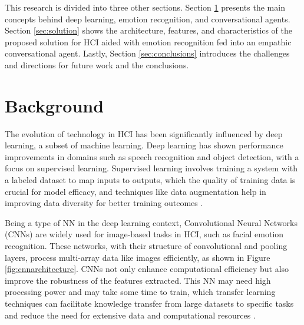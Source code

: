 \documentclass[runningheads]{llncs}
\begin{document}
This research is divided into three other sections. Section \ref{sec:background} presents the main concepts behind deep learning, emotion recognition, and conversational agents. Section \ref{sec:solution} shows the architecture, features, and characteristics of the proposed solution for HCI aided with emotion recognition fed into an empathic conversational agent. Lastly, Section \ref{sec:conclusions}  introduces the challenges and directions for future work and the conclusions. 

\section{Background}
\label{sec:background}

The evolution of technology in HCI has been significantly influenced by deep learning, a subset of machine learning. Deep learning has shown performance improvements in domains such as speech recognition and object detection, with a focus on supervised learning. Supervised learning involves training a system with a labeled dataset to map inputs to outputs, which the quality of training data is crucial for model efficacy, and techniques like data augmentation help in improving data diversity for better training outcomes \cite{Lecun2015, Alrowais2023, Benitez2021}.

Being a type of NN in the deep learning context, Convolutional Neural Networks (CNNs) are widely used for image-based tasks in HCI, such as facial emotion recognition. These networks, with their structure of convolutional and pooling layers, process multi-array data like images efficiently, as shown in Figure \ref{fig:cnnarchitecture}. CNNs not only enhance computational efficiency but also improve the robustness of the features extracted. This NN may need high processing power and may take some time to train, which transfer learning techniques can facilitate knowledge transfer from large datasets to specific tasks and reduce the need for extensive data and computational resources \cite{Lecun2015, Khan2020}.
\end{document}
